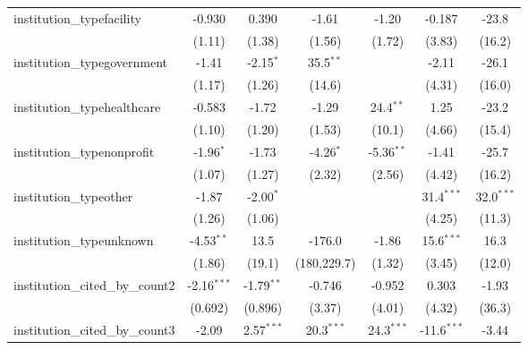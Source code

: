 \begin{tabular}{lcccccc}
   institution\_typefacility             & -0.930        & 0.390        & -1.61         & -1.20         & -0.187        & -23.8\\   
                                         & (1.11)        & (1.38)       & (1.56)        & (1.72)        & (3.83)        & (16.2)\\   
   institution\_typegovernment           & -1.41         & -2.15$^{*}$  & 35.5$^{**}$   &               & -2.11         & -26.1\\   
                                         & (1.17)        & (1.26)       & (14.6)        &               & (4.31)        & (16.0)\\   
   institution\_typehealthcare           & -0.583        & -1.72        & -1.29         & 24.4$^{**}$   & 1.25          & -23.2\\   
                                         & (1.10)        & (1.20)       & (1.53)        & (10.1)        & (4.66)        & (15.4)\\   
   institution\_typenonprofit            & -1.96$^{*}$   & -1.73        & -4.26$^{*}$   & -5.36$^{**}$  & -1.41         & -25.7\\   
                                         & (1.07)        & (1.27)       & (2.32)        & (2.56)        & (4.42)        & (16.2)\\   
   institution\_typeother                & -1.87         & -2.00$^{*}$  &               &               & 31.4$^{***}$  & 32.0$^{***}$\\   
                                         & (1.26)        & (1.06)       &               &               & (4.25)        & (11.3)\\   
   institution\_typeunknown              & -4.53$^{**}$  & 13.5         & -176.0        & -1.86         & 15.6$^{***}$  & 16.3\\   
                                         & (1.86)        & (19.1)       & (180,229.7)   & (1.32)        & (3.45)        & (12.0)\\   
   institution\_cited\_by\_count2        & -2.16$^{***}$ & -1.79$^{**}$ & -0.746        & -0.952        & 0.303         & -1.93\\   
                                         & (0.692)       & (0.896)      & (3.37)        & (4.01)        & (4.32)        & (36.3)\\   
   institution\_cited\_by\_count3        & -2.09         & 2.57$^{***}$ & 20.3$^{***}$  & 24.3$^{***}$  & -11.6$^{***}$ & -3.44\\   

\end{tabular}
